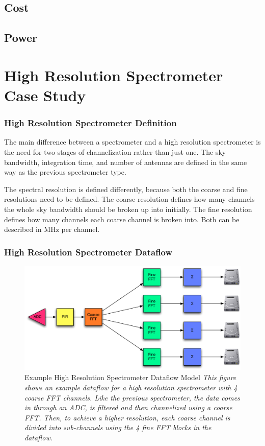 \subsection{Cost}
\subsection{Power}

\section{High Resolution Spectrometer Case Study}
\subsubsection{High Resolution Spectrometer Definition}
The main difference between a spectrometer and a high resolution spectrometer is the need for two stages of channelization rather than just one. 
The sky bandwidth, integration time, and number of antennas are defined in the same way as the previous spectrometer type. 

The spectral resolution is defined differently, because both the coarse and fine resolutions need to be defined. 
The coarse resolution defines how many channels the whole sky bandwidth should be broken up into initially.
The fine resolution defines how many channels each coarse channel is broken into.
Both can be described in MHz per channel.

\subsubsection{High Resolution Spectrometer Dataflow}

\begin{figure}[ht!]
  \centering
    \includegraphics[width=1\textwidth]{Images/C4/hires_spectrometer_dataflow.pdf}
  \caption[Example High Resolution Spectrometer Dataflow Model]{Example High Resolution Spectrometer Dataflow Model
  \textit{
  This figure shows an example dataflow for a high resolution spectrometer with 4 coarse FFT channels.
  Like the previous spectrometer, the data comes in through an ADC, is filtered and then channelized using a coarse FFT.
  Then, to achieve a higher resolution, each coarse channel is divided into sub-channels using the 4 fine FFT blocks in the dataflow. 
  }}

  \label{fig: C4/hires_spectrometer_dataflow.pdf}
\end{figure}

